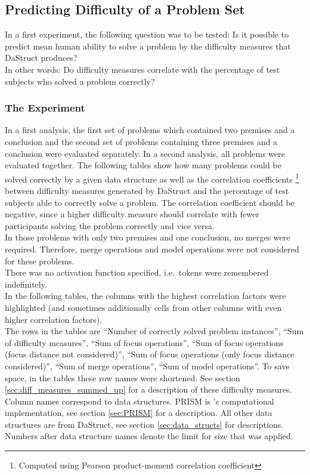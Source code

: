 \documentclass[hidelinks]{scrartcl}
\begin{document}
\subsection{Predicting Difficulty of a Problem Set}\label{sec:exp1}
In a first experiment, the following question was to be tested: Is it possible to predict mean human ability to solve a problem by the difficulty measures that DaStruct produces? \\
In other words: Do difficulty measures correlate with the percentage of test subjects who solved a problem correctly?

\subsubsection{The Experiment}
In a first analysis, the first set of problems which contained two premises and a conclusion and the second set of problems containing three premises and a conclusion were evaluated separately. In a second analysis, all problems were evaluated together. The following tables show how many problems could be solved correctly by a given data structure as well as the correlation coefficients \footnote{Computed using Pearson product-moment correlation coefficient} between difficulty measures generated by DaStruct and the percentage of test subjects able to correctly solve a problem. The correlation coefficient should be negative, since a higher difficulty measure should correlate with fewer participants solving the problem correctly and vice versa. \\
In those problems with only two premises and one conclusion, no merges were required. Therefore, merge operations and model operations were not considered for these problems. \\
There was no activation function specified, i.e.\ tokens were remembered indefinitely. \\
In the following tables, the columns with the highest correlation factors were highlighted (and sometimes additionally cells from other columns with even higher correlation factors).\\
The rows in the tables are ``Number of correctly solved problem instances'', ``Sum of difficulty measures'', ``Sum of focus operations'', ``Sum of focus operations (focus distance not considered)'', ``Sum of focus operations (only focus distance considered)'', ``Sum of merge operations'', ``Sum of model operations''. To save space, in the tables these row names were shortened. See section \ref{sec:diff_measures_summed_up} for a description of these difficulty measures. Column names correspond to data structures. PRISM is \cite{Ragni.2013}'s computational implementation, see section \ref{sec:PRISM} for a description. All other data structures are from DaStruct, see section \ref{sec:data_structs} for descriptions. Numbers after data structure names denote the limit for size that was applied.
\end{document}
